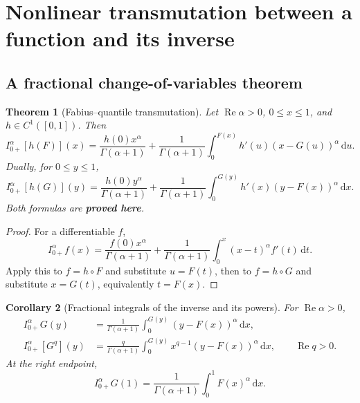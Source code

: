 \documentclass[11pt]{article}
\newcommand{\statusproved}{\textcolor{statusgreen}{\textbf{proved here}}}
\newtheorem{theorem}{Theorem}[section]
\newtheorem{corollary}[theorem]{Corollary}
\theoremstyle{definition}
\theoremstyle{remark}
\newcommand{\dd}{\,\mathrm d}
\newcommand{\Ree}{\operatorname{Re}}
\begin{document}
\section{Nonlinear transmutation between a function and its inverse}
\label{sec:inverse}

\subsection{A fractional change-of-variables theorem}

\begin{theorem}[Fabius--quantile transmutation]
\label{thm:quantile-transmutation}
Let $\Ree\alpha>0$, $0\le x\le1$, and $h\in C^1([0,1])$.  Then
\begin{equation}
 I_{0+}^{\alpha}[h(F)](x)
 =\frac{h(0)x^\alpha}{\Gamma(\alpha+1)}
 +\frac1{\Gamma(\alpha+1)}
 \int_0^{F(x)}h'(u)(x-G(u))^\alpha\dd u.
 \label{eq:F-to-G-transmutation}
\end{equation}
Dually, for $0\le y\le1$,
\begin{equation}
 I_{0+}^{\alpha}[h(G)](y)
 =\frac{h(0)y^\alpha}{\Gamma(\alpha+1)}
 +\frac1{\Gamma(\alpha+1)}
 \int_0^{G(y)}h'(x)(y-F(x))^\alpha\dd x.
 \label{eq:G-to-F-transmutation}
\end{equation}
Both formulas are \statusproved.
\end{theorem}

\begin{proof}
For a differentiable $f$,
\[
 I_{0+}^{\alpha}f(x)
 =\frac{f(0)x^\alpha}{\Gamma(\alpha+1)}
 +\frac1{\Gamma(\alpha+1)}\int_0^x(x-t)^\alpha f'(t)\dd t.
\]
Apply this to $f=h\circ F$ and substitute $u=F(t)$, then to $f=h\circ G$ and substitute
$x=G(t)$, equivalently $t=F(x)$.
\end{proof}

\begin{corollary}[Fractional integrals of the inverse and its powers]
\label{cor:inverse-fractional-integral}
For $\Ree\alpha>0$,
\begin{align}
 I_{0+}^{\alpha}G(y)
 &=\frac1{\Gamma(\alpha+1)}
   \int_0^{G(y)}(y-F(x))^\alpha\dd x,\label{eq:inverse-RL}\\
 I_{0+}^{\alpha}[G^q](y)
 &=\frac q{\Gamma(\alpha+1)}
   \int_0^{G(y)}x^{q-1}(y-F(x))^\alpha\dd x,
 \qquad \Ree q>0.\label{eq:inverse-power-RL}
\end{align}
At the right endpoint,
\begin{equation}
 I_{0+}^{\alpha}G(1)
 =\frac1{\Gamma(\alpha+1)}\int_0^1F(x)^\alpha\dd x.
 \label{eq:inverse-RL-endpoint}
\end{equation}
\end{corollary}
\end{document}

